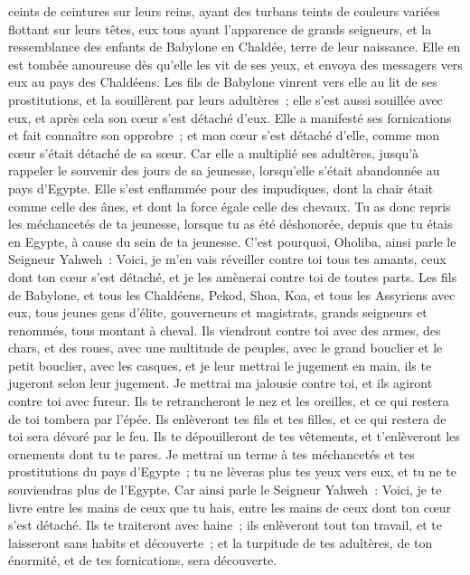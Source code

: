 \begin{multicols}{2}
ceints de ceintures sur leurs reins, ayant des turbans teints de couleurs variées flottant sur leurs têtes, eux tous ayant l'apparence de grands seigneurs, et la ressemblance des enfants de Babylone en Chaldée, terre de leur naissance.
Elle en est tombée amoureuse dès qu'elle les vit de ses yeux, et envoya des messagers vers eux au pays des Chaldéens.
Les fils de Babylone vinrent vers elle au lit de ses prostitutions, et la souillèrent par leurs adultères~; elle s'est aussi souillée avec eux, et après cela son cœur s'est détaché d'eux.
Elle a manifesté ses fornications et fait connaître son opprobre~; et mon cœur s'est détaché d'elle, comme mon cœur s'était détaché de sa sœur.
Car elle a multiplié ses adultères, jusqu'à rappeler le souvenir des jours de sa jeunesse, lorsqu'elle s'était abandonnée au pays d'Egypte.
Elle s'est enflammée pour des impudiques, dont la chair était comme celle des ânes, et dont la force égale celle des chevaux.
Tu as donc repris les méchancetés de ta jeunesse, lorsque tu as été déshonorée, depuis que tu étais en Egypte, à cause du sein de ta jeunesse.
C'est pourquoi, Oholiba, ainsi parle le Seigneur Yahweh~: Voici, je m'en vais réveiller contre toi tous tes amants, ceux dont ton cœur s'est détaché, et je les amènerai contre toi de toutes parts.
Les fils de Babylone, et tous les Chaldéens, Pekod, Shoa, Koa, et tous les Assyriens avec eux, tous jeunes gens d'élite, gouverneurs et magistrats, grands seigneurs et renommés, tous montant à cheval.
Ils viendront contre toi avec des armes, des chars, et des roues, avec une multitude de peuples, avec le grand bouclier et le petit bouclier, avec les casques, et je leur mettrai le jugement en main, ils te jugeront selon leur jugement.
Je mettrai ma jalousie contre toi, et ils agiront contre toi avec fureur. Ils te retrancheront le nez et les oreilles, et ce qui restera de toi tombera par l'épée. Ils enlèveront tes fils et tes filles, et ce qui restera de toi sera dévoré par le feu.
Ils te dépouilleront de tes vêtements, et t'enlèveront les ornements dont tu te pares.
Je mettrai un terme à tes méchancetés et tes prostitutions du pays d'Egypte~; tu ne lèveras plus tes yeux vers eux, et tu ne te souviendras plus de l'Egypte.
Car ainsi parle le Seigneur Yahweh~: Voici, je te livre entre les mains de ceux que tu hais, entre les mains de ceux dont ton cœur s'est détaché.
Ils te traiteront avec haine~; ils enlèveront tout ton travail, et te laisseront sans habits et découverte~; et la turpitude de tes adultères, de ton énormité, et de tes fornications, sera découverte.

\end{multicols}
